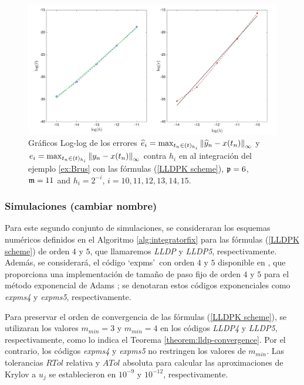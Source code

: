 \begin{figure}[h]
	\begin{center}
		\includegraphics[scale=0.45]{Graphics/lldp/LLDP-plots.jpg}
		\caption{ Gráficos Log-log de los errores $\widehat{e}_i=\max_{t_n\in(t)_{h_i}}\left\lVert \widehat{y}_n-x(t_n) \right\rVert_\infty$ y $e_i=\max_{t_n\in(t)_{h_i}}\left\lVert y_n-x(t_n) \right\rVert_\infty$ contra $h_i$ en al integración del ejemplo \ref{ex:Brus} con las fórmulas (\ref{LLDPK scheme}), $\mathfrak{p}=6$, $\mathfrak{m}=11$ and $h_i=2^{-i}$, $i=10,11,12,13,14,15$.}
		\label{fig:num-exp-lldp-fix-step:Fig4}
	\end{center}
\end{figure}

\subsubsection{Simulaciones (cambiar nombre)}
Para este segundo conjunto de simulaciones, se consideraran los esquemas numéricos definidos en el Algoritmo \ref{alg:integratorfix} para las fórmulas (\ref{LLDPK scheme}) de orden $4$ y $5$, que llamaremos \emph{LLDP } y \emph{LLDP5}, respectivamente. Además, se considerará, el código \textquoteleft expms\textquoteright~con orden $4$ y $5$ disponible en \cite{jansing2011expode}, que proporciona una implementación de tamaño de paso fijo de orden $4$ y $5$ para el método exponencial de Adams \cite{hochbruck2011exponential}; se denotaran estos códigos exponenciales como \emph{expms4} y \emph{expms5}, respectivamente.

Para preservar el orden de convergencia de las fórmulas (\ref{LLDPK scheme}), se utilizaran los valores $m_{min}=3$ y $m_{min}=4$ en los códigos \emph{LLDP4} y \emph{ LLDP5}, respectivamente, como lo indica el Teorema \ref{theorem:lldp-convergence}. Por el contrario, los códigos \emph{expms4} y \emph{expms5} no restringen los valores de $m_{min}$. Las tolerancias $RTol$ relativa y $ATol$ absoluta para calcular las aproximaciones de Krylov a $u_j$ se establecieron en $10^{-9}$ y $10^{-12}$, respectivamente.

